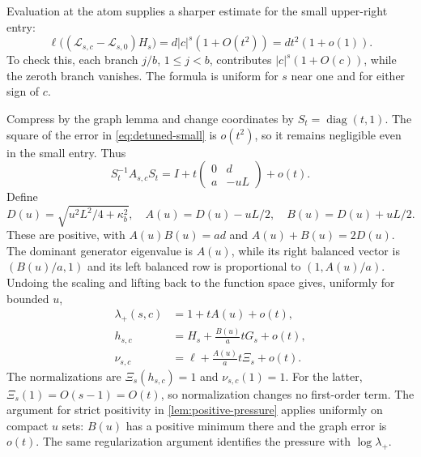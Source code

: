 \documentclass[11pt,a4paper]{article}
\numberwithin{equation}{section}
\theoremstyle{definition}
\theoremstyle{remark}
\newcommand{\Lop}{\mathcal L}
\begin{document}
Evaluation at the atom supplies a sharper estimate for the small
upper-right entry:
\begin{equation}
 \ell\bigl((\Lop_{s,c}-\Lop_{s,0})H_s\bigr)
       =d|c|^s(1+O(t^2))=dt^2(1+o(1)).
 \label{eq:detuned-small-entry}
\end{equation}
To check this, each branch $j/b$, $1\le j<b$, contributes
$|c|^s(1+O(c))$, while the zeroth branch vanishes. The formula is uniform
for $s$ near one and for either sign of $c$.

Compress by the graph lemma and change coordinates by
$S_t=\operatorname{diag}(t,1)$. The square of the error in
\cref{eq:detuned-small} is $o(t^2)$, so it remains negligible even in
the small entry. Thus
\begin{equation}
 S_t^{-1}A_{s,c}S_t
 =I+t\begin{pmatrix}0&d\\a&-uL\end{pmatrix}+o(t).
 \label{eq:balanced}
\end{equation}
Define
\begin{equation}
 D(u)=\sqrt{u^2L^2/4+\kappa_b^2},\quad
 A(u)=D(u)-uL/2,\quad B(u)=D(u)+uL/2.
 \label{eq:AB}
\end{equation}
These are positive, with $A(u)B(u)=ad$ and $A(u)+B(u)=2D(u)$.
The dominant generator eigenvalue is $A(u)$, while its right balanced
vector is $(B(u)/a,1)$ and its left balanced row is proportional to
$(1,A(u)/a)$. Undoing the scaling and lifting back to the function space
gives, uniformly for bounded $u$,
\begin{align}
 \lambda_+(s,c)&=1+tA(u)+o(t),\label{eq:old-crossover}\\
 h_{s,c}&=H_s+\frac{B(u)}a tG_s+o(t),\label{eq:right-detuned}\\
 \nu_{s,c}&=\ell+\frac{A(u)}a t\Xi_s+o(t).
 \label{eq:left-detuned}
\end{align}
The normalizations are $\Xi_s(h_{s,c})=1$ and $\nu_{s,c}(1)=1$.
For the latter, $\Xi_s(1)=O(s-1)=O(t)$, so normalization changes no
first-order term. The argument for strict positivity in
\cref{lem:positive-pressure} applies uniformly on compact $u$ sets:
$B(u)$ has a positive minimum there and the graph error is $o(t)$.
The same regularization argument identifies the pressure with
$\log\lambda_+$.
\end{document}
